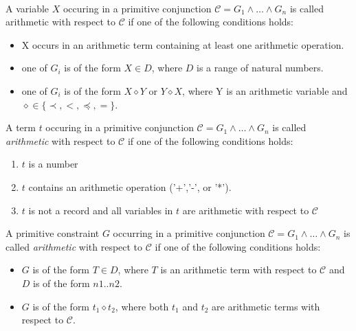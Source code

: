 \documentclass{llncs}
\begin{document}
 \begin{definition} \label{arithmetic variable} \\
  {\rm
    A variable $X$ occuring in a primitive conjunction $\mathcal{C}=G_1 \land \dots \land G_n$ is called arithmetic with respect to $\mathcal{C}$ if one of the following conditions holds:
    \begin{itemize}
      \item X occurs in an arithmetic term containing at least one arithmetic operation.
      \item one of $G_i$ is of the form  $X \in D$, where $D$ is a range of natural numbers.
      \item one of $G_i$ is of the form  $X \diamond Y$ or $Y \diamond X$, where Y is an arithmetic variable and $\diamond \in \{ \prec,<,\preceq,=\}$. 
   \end{itemize}
 
  }
 \end{definition}
\begin{definition} \label{aterm}
{\rm
 A term $t$ occuring in a primitive conjunction $\mathcal{C}=G_1 \land \dots \land G_n$ is called \textit{arithmetic} 
with respect to $\mathcal{C}$ if one of the following conditions holds:
 \begin{enumerate}
  \item $t$ is a number
  \item $t$ contains an arithmetic operation ('+','-', or '*').
  \item $t$ is not a record and all variables in $t$ are arithmetic with respect to $\mathcal{C}$
 \end{enumerate}
}
\end{definition}

 \begin{definition} \label{primitive arithmetic constraint}
{\rm
   A primitive constraint $G$ occurring in a primitive conjunction $\mathcal{C}=G_1 \land \dots \land G_n$  
is called \textit{arithmetic} with respect to $\mathcal{C}$ if one of the following conditions holds:
 \begin{itemize}
  \item $G$ is of the form $T \in D$, where $T$ is an arithmetic term with respect to $\mathcal{C}$ and $D$ is of the form $n1..n2$.
  \item $G$ is of the form $t_1\diamond t_2$, where both $t_1$ and $t_2$ are arithmetic terms with respect to $\mathcal{C}$. 
 \end{itemize}
}
 \end{definition}
\end{document}
